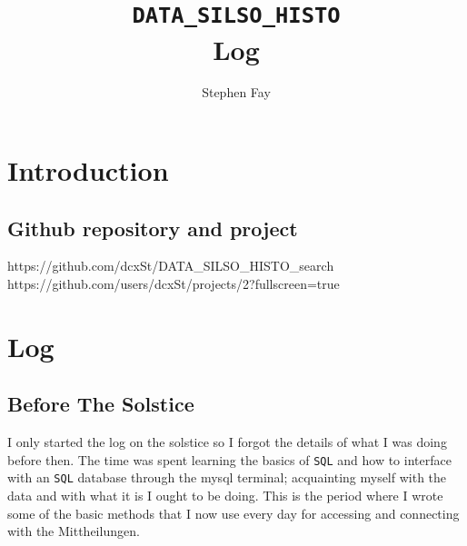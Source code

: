 \documentclass[12pt]{article}
\renewcommand\qedsymbol{$\Smiley$}%
\begin{document}
 
 
\title{\texttt{DATA\_SILSO\_HISTO}\\Log}
\author{Stephen Fay}
\maketitle

\tableofcontents

\section{Introduction}
\subsection{Github repository and project}
    https://github.com/dcxSt/DATA\_SILSO\_HISTO\_search \\
    https://github.com/users/dcxSt/projects/2?fullscreen=true


\section{Log}

\subsection{Before The Solstice}
I only started the log on the solstice so I forgot the details of what I was doing before then. The time was spent learning the basics of \texttt{SQL} and how to interface with an \texttt{SQL} database through the mysql terminal; acquainting myself with the data and with what it is I ought to be doing. This is the period where I wrote some of the basic methods that I now use every day for accessing and connecting with the Mittheilungen.
\end{document}
